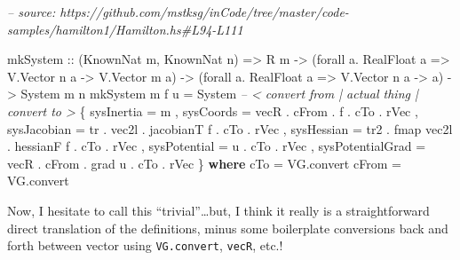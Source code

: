 \documentclass[]{article}
\newenvironment{Shaded}{}{}
\newcommand{\CommentTok}[1]{\textcolor[rgb]{0.38,0.63,0.69}{\textit{#1}}}
\newcommand{\DataTypeTok}[1]{\textcolor[rgb]{0.56,0.13,0.00}{#1}}
\newcommand{\FunctionTok}[1]{\textcolor[rgb]{0.02,0.16,0.49}{#1}}
\newcommand{\KeywordTok}[1]{\textcolor[rgb]{0.00,0.44,0.13}{\textbf{#1}}}
\newcommand{\NormalTok}[1]{#1}
\newcommand{\OtherTok}[1]{\textcolor[rgb]{0.00,0.44,0.13}{#1}}
\begin{document}
\begin{Shaded}
\begin{Highlighting}[]
\CommentTok{-- source: https://github.com/mstksg/inCode/tree/master/code-samples/hamilton1/Hamilton.hs#L94-L111}

\NormalTok{mkSystem}
\OtherTok{    ::}\NormalTok{ (}\DataTypeTok{KnownNat}\NormalTok{ m, }\DataTypeTok{KnownNat}\NormalTok{ n)}
    \OtherTok{=>} \DataTypeTok{R}\NormalTok{ m}
    \OtherTok{->}\NormalTok{ (forall a}\FunctionTok{.} \DataTypeTok{RealFloat}\NormalTok{ a }\OtherTok{=>} \DataTypeTok{V.Vector}\NormalTok{ n a }\OtherTok{->} \DataTypeTok{V.Vector}\NormalTok{ m a)}
    \OtherTok{->}\NormalTok{ (forall a}\FunctionTok{.} \DataTypeTok{RealFloat}\NormalTok{ a }\OtherTok{=>} \DataTypeTok{V.Vector}\NormalTok{ n a }\OtherTok{->}\NormalTok{ a)}
    \OtherTok{->} \DataTypeTok{System}\NormalTok{ m n}
\NormalTok{mkSystem m f u }\FunctionTok{=} \DataTypeTok{System}
                    \CommentTok{-- < convert from      | actual thing | convert to >}
\NormalTok{    \{ sysInertia       }\FunctionTok{=}\NormalTok{                     m}
\NormalTok{    , sysCoords        }\FunctionTok{=}\NormalTok{ vecR }\FunctionTok{.}\NormalTok{ cFrom      }\FunctionTok{.}\NormalTok{ f            }\FunctionTok{.}\NormalTok{ cTo }\FunctionTok{.}\NormalTok{ rVec}
\NormalTok{    , sysJacobian      }\FunctionTok{=}\NormalTok{ tr   }\FunctionTok{.}\NormalTok{ vec2l      }\FunctionTok{.}\NormalTok{ jacobianT f  }\FunctionTok{.}\NormalTok{ cTo }\FunctionTok{.}\NormalTok{ rVec}
\NormalTok{    , sysHessian       }\FunctionTok{=}\NormalTok{ tr2  }\FunctionTok{.}\NormalTok{ fmap vec2l }\FunctionTok{.}\NormalTok{ hessianF f   }\FunctionTok{.}\NormalTok{ cTo }\FunctionTok{.}\NormalTok{ rVec}
\NormalTok{    , sysPotential     }\FunctionTok{=}\NormalTok{                     u            }\FunctionTok{.}\NormalTok{ cTo }\FunctionTok{.}\NormalTok{ rVec}
\NormalTok{    , sysPotentialGrad }\FunctionTok{=}\NormalTok{ vecR }\FunctionTok{.}\NormalTok{ cFrom      }\FunctionTok{.}\NormalTok{ grad u       }\FunctionTok{.}\NormalTok{ cTo }\FunctionTok{.}\NormalTok{ rVec}
\NormalTok{    \}}
  \KeywordTok{where}
\NormalTok{    cTo   }\FunctionTok{=}\NormalTok{ VG.convert}
\NormalTok{    cFrom }\FunctionTok{=}\NormalTok{ VG.convert}
\end{Highlighting}
\end{Shaded}

Now, I hesitate to call this ``trivial''\ldots{}but, I think it really is a
straightforward direct translation of the definitions, minus some boilerplate
conversions back and forth between vector using \texttt{VG.convert},
\texttt{vecR}, etc.!
\end{document}
